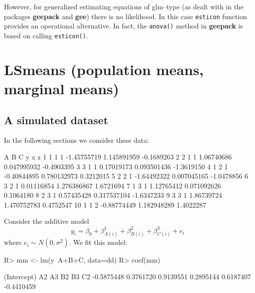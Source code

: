 \documentclass[11pt]{article}
\def\pkg#1{{\bf #1}}
\def\code#1{\texttt{#1}}
\begin{document}
However, for generalized estimating equations of glm--type (as dealt
with in the packages \pkg{geepack} and \pkg{gee}) there is no
likelihood. In this case \code{esticon} function provides an
operational alternative. In fact, the \code{anova()} method in
\pkg{geepack} is based on calling \code{esticon()}.






\section{LSmeans (population means, marginal means)}
\label{sec:xxx}

\subsection{A simulated dataset}
\label{sec:simulated-dataset}

In the following sections we consider these data:
\begin{Schunk}
\begin{Soutput}
   A B C           y           x          z
1  1 1 1 -1.45755719 1.145891959 -0.1689263
2  2 1 1  1.06740686 0.047995932 -0.4903395
3  3 1 1  0.17019173 0.093501436 -1.3619150
4  1 2 1 -0.40844895 0.780132973  0.3212015
5  2 2 1 -1.64492322 0.007045165 -1.0478856
6  3 2 1  0.01116854 1.276386867  1.6721694
7  1 3 1  1.12765412 0.071092626  0.1064180
8  2 3 1  0.57435428 0.317537104 -1.6347233
9  3 3 1  1.86739724 1.470752783  0.4752547
10 1 1 2 -0.88774449 1.182948289  1.4022287
\end{Soutput}
\end{Schunk}

Consider the additive model
\begin{equation}
  \label{eq:1}
  y_i = \beta_0 + \beta^1_{A(i)}+\beta^2_{B(i)} + \beta^3_{C(i)} + e_i
\end{equation}
where $e_i \sim N(0,\sigma^2)$. We fit this model:

\begin{Schunk}
\begin{Sinput}
R> mm <- lm(y~A+B+C, data=dd)
R> coef(mm)
\end{Sinput}
\begin{Soutput}
(Intercept)          A2          A3          B2          B3          C2 
 -0.5875448   0.3761720   0.9139551   0.2895144   0.6187407  -0.4410459 
\end{Soutput}
\end{Schunk}
\end{document}
